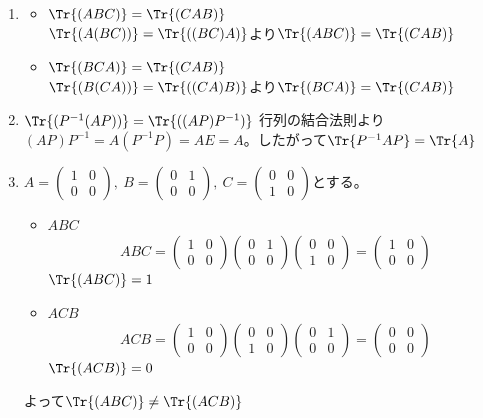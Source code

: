 \documentclass[dvipdfmx]{jsreport}
\begin{document}
\begin{souanswer}
\begin{enumerate}
	\item 
\begin{itemize}
	\item $\Tr{(ABC)}= \Tr{(CAB)}$\\
	$\Tr{(A(BC))}= \Tr{((BC)A)}$より$\Tr{(ABC)}= \Tr{(CAB)}$
	\item $\Tr{(BCA)}= \Tr{(CAB)}$\\
	$\Tr{(B(CA))}= \Tr{((CA)B)}$より$\Tr{(BCA)}= \Tr{(CAB)}$
\end{itemize}

	\item $\Tr{(P^{-1}(AP))}= \Tr{((AP)P^{-1})}$
	行列の結合法則より$(AP)P^{-1}= A(P^{-1}P)= AE= A$。したがって$\Tr{P^{-1}AP}= \Tr{A}$

	\item $A= \begin{pmatrix}1& 0\\ 0& 0\end{pmatrix},\ B= \begin{pmatrix}0& 1\\ 0& 0\end{pmatrix},\ C= \begin{pmatrix}0& 0\\ 1& 0\end{pmatrix}$とする。
\begin{itemize}
	\item $ABC$
\begin{equation*}
	ABC= \begin{pmatrix}1& 0\\ 0& 0\end{pmatrix}\begin{pmatrix}0& 1\\ 0& 0\end{pmatrix}\begin{pmatrix}0& 0\\ 1& 0\end{pmatrix}= \begin{pmatrix}1& 0\\ 0& 0\end{pmatrix}
\end{equation*}
	$\Tr{(ABC)}= 1$

	\item $ACB$
\begin{equation*}
	ACB= \begin{pmatrix}1& 0\\ 0& 0\end{pmatrix}\begin{pmatrix}0& 0\\ 1& 0\end{pmatrix}\begin{pmatrix}0& 1\\ 0& 0\end{pmatrix}= \begin{pmatrix}0& 0\\ 0& 0\end{pmatrix}
\end{equation*}
	$\Tr{(ACB)}= 0$
\end{itemize}
	よって$\Tr{(ABC)}\ne \Tr{(ACB)}$
\end{enumerate}
\end{souanswer}
\end{document}
